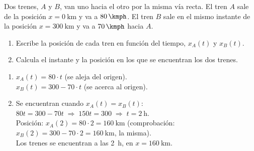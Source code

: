 \begin{exercise}
    Dos trenes, \(A\) y \(B\), van uno hacia el otro por la misma vía recta. El tren \(A\) sale de la posición \(x=\qty{0}{\km}\) y va a \(\qty{80}{\kmph}\). El tren \(B\) sale en el mismo instante de la posición \(x=\qty{300}{\km}\) y va a \(\qty{70}{\kmph}\) hacia \(A\).
    \begin{enumerate}[label=\letraminuscula]
        \item Escribe la posición de cada tren en función del tiempo, \(x_A(t)\) y \(x_B(t)\).
        \item Calcula el instante y la posición en los que se encuentran los dos trenes.
    \end{enumerate}
    \begin{solu}
        \begin{enumerate}[label=\alph*)]
            \item \(x_A(t) = 80 \cdot t\) (se aleja del origen). \\
            \(x_B(t) = 300 - 70 \cdot t\) (se acerca al origen).
            \item Se encuentran cuando \(x_A(t) = x_B(t)\): \(80t = 300 - 70t \;\Rightarrow\; 150t = 300 \;\Rightarrow\; t = \qty{2}{\hour}\). \\
            Posición: \(x_A(2) = 80 \cdot 2 = \qty{160}{\km}\) (comprobación: \(x_B(2) = 300 - 70\cdot 2 = \qty{160}{\km}\), la misma). \\
            Los trenes se encuentran a las \qty{2}{\hour}, en \(x = \qty{160}{\km}\).
        \end{enumerate}
    \end{solu}
\end{exercise}

